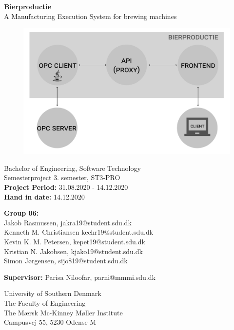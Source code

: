 \begin{titlepage}
\begin{center}
{ \LARGE \bfseries Bierproductie \\[0.4cm]}
A Manufacturing Execution System for brewing machines
\begin{figure}[H]
\centering 
\includegraphics[scale=0.5]{images/system_drawing.pdf}
\label{figure:bierproductie_system}
\end{figure}

Bachelor of Engineering, Software Technology\\
\vspace{2mm}
Semesterproject 3. semester, ST3-PRO\\
\vspace{2mm}
\textbf{Project Period:} 31.08.2020 - 14.12.2020 \\
\vspace{2mm}
\textbf{Hand in date:} 14.12.2020 \\

\vspace{7mm}

\textbf{Group 06:} \\
\vspace{2mm}
Jakob Rasmussen, jakra19@student.sdu.dk \\
\vspace{2mm}
Kenneth M. Christiansen kechr19@student.sdu.dk \\
\vspace{2mm}
Kevin K. M. Petersen, kepet19@student.sdu.dk \\
\vspace{2mm}
Kristian N. Jakobsen, kjako19@student.sdu.dk \\
\vspace{2mm}
Simon Jørgensen, sijo819@student.sdu.dk \\

\vspace{7mm}

\textbf{Supervisor:} Parisa Niloofar, parni@mmmi.sdu.dk \\

\vfill

University of Southern Denmark \\
The Faculty of Engineering \\
The Mærsk Mc-Kinney Møller Institute \\
Campusvej 55, 5230 Odense M 

\end{center}
\end{titlepage}
